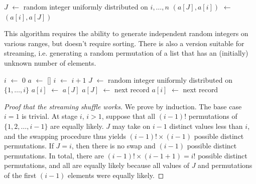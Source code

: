 \documentclass[12pt]{article}
\newcommand*\Let[2]{\State #1 $\gets$ #2}
\begin{document}
\begin{algorithm}                      %
\caption{Fisher-Yates-Knuth-Durstenfeld shuffle (backwards version)}          %
\label{FYKD}                           %
\begin{algorithmic}[1]               %
    \Let{$J$}{random integer uniformly distributed on $i, \dots, n$}
    \Let{$(a[J], a[i])$}{$(a[i], a[J])$}
\EndFor
\end{algorithmic}
\end{algorithm}

This algorithm requires the ability to generate independent random integers on various ranges, but doesn't require sorting.
There is also a version suitable for streaming, i.e. generating a random permutation of a list that has an (initially) unknown number of elements.

\begin{algorithm}                      %
\caption{Fisher-Yates-Knuth-Durstenfeld shuffle (streaming version)}          %
\label{FYKD-streaming}                           %
\begin{algorithmic}[1]               %
\Let{$i$}{0}
\Let{$a$}{[]}
    \Let{$i$}{$i+1$}
    \Let{$J$}{random integer uniformly distributed on $\{1, \dots, i\}$}
        \Let{$a[i]$}{$a[J]$}
        \Let{$a[J]$}{next record}
    \Else
        \Let{$a[i]$}{next record} 
    \EndIf
\EndWhile \\
\end{algorithmic}
\end{algorithm}


\begin{proof}[Proof that the streaming shuffle works]
We prove by induction. The base case $i=1$ is trivial.
At stage $i$, $i>1$, suppose that all $(i-1)!$ permutations of $\{1, 2, \dots, i-1\}$ are equally likely.
$J$ may take on $i-1$ distinct values less than $i$, and the swapping procedure thus yields $(i-1)! \times (i-1)$
possible distinct permutations.
If $J = i$, then there is no swap and $(i-1)$ possible distinct permutations.
In total, there are $(i-1)! \times (i-1 + 1) = i!$ possible distinct permutations, and all are equally likely because
all values of $J$ and permutations of the first $(i-1)$ elements were equally likely.
\end{proof}
\end{document}
